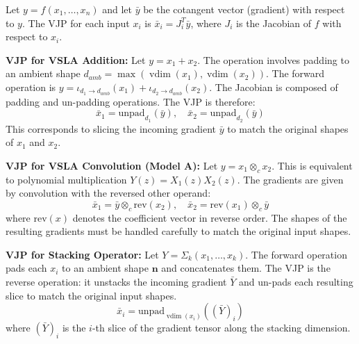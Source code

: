 \documentclass[11pt]{article}
\newcommand{\vdim}{\operatorname{vdim}}
\begin{document}
Let \(y = f(x_1, \dots, x_n)\) and let \(\bar{y}\) be the cotangent vector (gradient) with respect to \(y\). The VJP for each input \(x_i\) is \(\bar{x}_i = J_i^T \bar{y}\), where \(J_i\) is the Jacobian of \(f\) with respect to \(x_i\).

\textbf{VJP for VSLA Addition:} Let \(y = x_1 + x_2\). The operation involves padding to an ambient shape \(d_{amb} = \max(\vdim(x_1), \vdim(x_2))\). The forward operation is \(y = \iota_{d_1 \to d_{amb}}(x_1) + \iota_{d_2 \to d_{amb}}(x_2)\). The Jacobian is composed of padding and un-padding operations. The VJP is therefore:
\[
\bar{x}_1 = \text{unpad}_{d_1}(\bar{y}), \quad \bar{x}_2 = \text{unpad}_{d_2}(\bar{y})
\]
This corresponds to slicing the incoming gradient \(\bar{y}\) to match the original shapes of \(x_1\) and \(x_2\).

\textbf{VJP for VSLA Convolution (Model A):} Let \(y = x_1 \otimes_c x_2\). This is equivalent to polynomial multiplication \(Y(z) = X_1(z)X_2(z)\). The gradients are given by convolution with the reversed other operand:
\[
\bar{x}_1 = \bar{y} \otimes_c \text{rev}(x_2), \quad \bar{x}_2 = \text{rev}(x_1) \otimes_c \bar{y}
\]
where \(\text{rev}(x)\) denotes the coefficient vector in reverse order. The shapes of the resulting gradients must be handled carefully to match the original input shapes.

\textbf{VJP for Stacking Operator:} Let \(Y = \Sigma_k(x_1, \dots, x_k)\). The forward operation pads each \(x_i\) to an ambient shape \(\mathbf{n}\) and concatenates them. The VJP is the reverse operation: it unstacks the incoming gradient \(\bar{Y}\) and un-pads each resulting slice to match the original input shapes.
\[
\bar{x}_i = \text{unpad}_{\vdim(x_i)}( (\bar{Y})_i )
\]
where \((\bar{Y})_i\) is the $i$-th slice of the gradient tensor along the stacking dimension.
\end{document}
